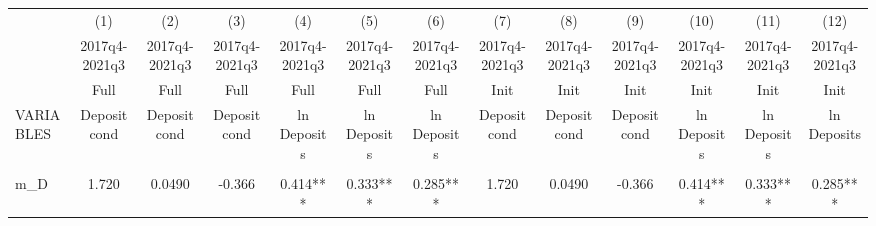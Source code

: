 \documentclass[]{article}
\begin{document}
\begin{center}
\begin{tabular}{lcccccccccccc} \hline
 & (1) & (2) & (3) & (4) & (5) & (6) & (7) & (8) & (9) & (10) & (11) & (12) \\
 & 2017q4-2021q3 & 2017q4-2021q3 & 2017q4-2021q3 & 2017q4-2021q3 & 2017q4-2021q3 & 2017q4-2021q3 & 2017q4-2021q3 & 2017q4-2021q3 & 2017q4-2021q3 & 2017q4-2021q3 & 2017q4-2021q3 & 2017q4-2021q3 \\
 & Full & Full & Full & Full & Full & Full & Init & Init & Init & Init & Init & Init \\
VARIABLES & Deposit cond & Deposit cond & Deposit cond & ln Deposits & ln Deposits & ln Deposits & Deposit cond & Deposit cond & Deposit cond & ln Deposits & ln Deposits & ln Deposits \\ \hline
\vspace{4pt} & \begin{footnotesize}\end{footnotesize} & \begin{footnotesize}\end{footnotesize} & \begin{footnotesize}\end{footnotesize} & \begin{footnotesize}\end{footnotesize} & \begin{footnotesize}\end{footnotesize} & \begin{footnotesize}\end{footnotesize} & \begin{footnotesize}\end{footnotesize} & \begin{footnotesize}\end{footnotesize} & \begin{footnotesize}\end{footnotesize} & \begin{footnotesize}\end{footnotesize} & \begin{footnotesize}\end{footnotesize} & \begin{footnotesize}\end{footnotesize} \\
m\_D & 1.720 & 0.0490 & -0.366 & 0.414*** & 0.333*** & 0.285*** & 1.720 & 0.0490 & -0.366 & 0.414*** & 0.333*** & 0.285*** \\

\end{tabular}
\end{center}
\end{document}
